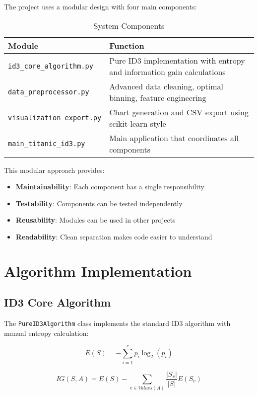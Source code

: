 \documentclass[12pt,a4paper]{article}
\newcommand{\file}[1]{\texttt{#1}}
\begin{document}
The project uses a modular design with four main components:

\begin{table}[!htbp]
\centering
\begin{tabular}{|l|p{8cm}|}
\hline
\textbf{Module} & \textbf{Function} \\
\hline
\file{id3\_core\_algorithm.py} & Pure ID3 implementation with entropy and information gain calculations \\
\hline
\file{data\_preprocessor.py} & Advanced data cleaning, optimal binning, feature engineering \\
\hline
\file{visualization\_export.py} & Chart generation and CSV export using scikit-learn style \\
\hline
\file{main\_titanic\_id3.py} & Main application that coordinates all components \\
\hline
\end{tabular}
\caption{System Components}
\end{table}

This modular approach provides:
\begin{itemize}
    \item \textbf{Maintainability}: Each component has a single responsibility
    \item \textbf{Testability}: Components can be tested independently
    \item \textbf{Reusability}: Modules can be used in other projects
    \item \textbf{Readability}: Clean separation makes code easier to understand
\end{itemize}

\section{Algorithm Implementation}

\subsection{ID3 Core Algorithm}
The \file{PureID3Algorithm} class implements the standard ID3 algorithm with manual entropy calculation:

\begin{equation}
E(S) = -\sum_{i=1}^{c} p_i \log_2(p_i)
\end{equation}

\begin{equation}
IG(S,A) = E(S) - \sum_{v \in Values(A)} \frac{|S_v|}{|S|} E(S_v)
\end{equation}
\end{document}
